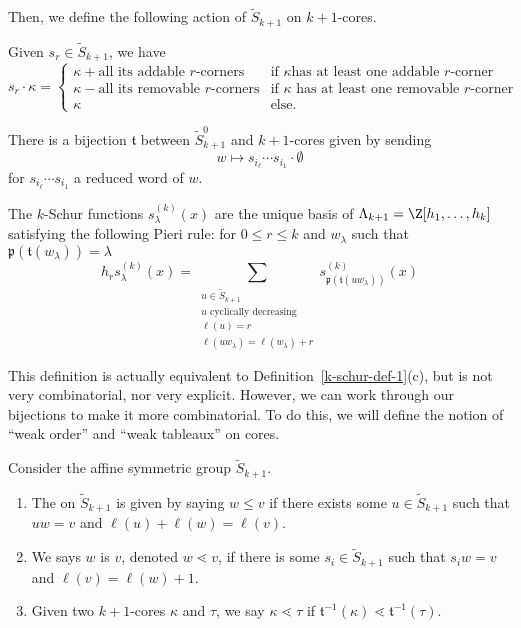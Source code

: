 \documentclass[11pt,leqno,oneside]{amsart}
\numberwithin{thm}{section}
\newcommand{\eS}{\tilde{S}}
\newcommand{\sym}{\Lambda}
\newcommand{\coveredby}{\mathrel{\lessdot}}
\begin{document}
Then, we define the following action of \(\eS_{k+1}\) on
\(k+1\)-cores.
\begin{defn}
  Given \(s_r \in \eS_{k+1}\), we have \[
    s_r \cdot \kappa =
    \begin{cases}
      \kappa + \text{all its addable $r$-corners} & \text{if $\kappa$
        has at least one addable $r$-corner}\\
      \kappa - \text{all its removable $r$-corners} & \text{if
        $\kappa$ has at least one removable $r$-corner}\\
      \kappa & \text{else.}
    \end{cases}
  \]
\end{defn}
\begin{prop}
  There is a bijection \(\mathfrak{t}\) between \(\eS_{k+1}^0\) and \(k+1\)-cores given
  by sending \[
    w \mapsto s_{i_\ell} \cdots s_{i_1} \cdot \emptyset
  \]
  for \(s_{i_\ell} \cdots s_{i_1}\) a reduced word of \(w\).
\end{prop}
\begin{defn}\label{k-schur-def-2}
  The \(k\)-Schur functions \(s_\lambda^{(k)}(x)\) are the unique
  basis of \(\sym_{k+1} = \Z[h_1,\ldots,h_k]\) satisfying the
  following Pieri
  rule:
  for \(0 \leq r \leq k\) and \(w_\lambda\) such that
  \(\mathfrak{p}(\mathfrak{t}(w_\lambda)) = \lambda\)
  \[
    h_r s_\lambda^{(k)}(x) = \sum_{\substack{u \in \eS_{k+1} \\ u
        \text{ cyclically decreasing}\\ \ell(u)
    = r \\ \ell(uw_\lambda) = \ell(w_\lambda)+r}} s_{\mathfrak{p}(\mathfrak{t}(uw_\lambda))}^{(k)}(x)
  \]
\end{defn}
This definition is actually equivalent to
Definition~\ref{k-schur-def-1}(c), but is not very combinatorial, nor
very explicit. However, we can work through our bijections to make it
more combinatorial. To do this, we will define the notion of ``weak
order'' and ``weak
tableaux'' on cores.
\begin{defn}
  Consider the affine symmetric group \(\eS_{k+1}\).
  \begin{enumerate}
  \item The  on \(\eS_{k+1}\) is given by saying
    \(w \leq v\) if there exists some \(u \in \eS_{k+1}\) such that
    \(uw = v\) and \(\ell(u) + \ell(w) = \ell(v)\).
  \item We says \(w\) is  \(v\), denoted \(w \coveredby v\),
    if there is some \(s_i \in \eS_{k+1}\) such that \(s_i w = v\) and
    \(\ell(v) = \ell(w)+1\).
  \item Given two \(k+1\)-cores \(\kappa\) and \(\tau\), we say
    \(\kappa \coveredby \tau\) if \(\mathfrak{t}^{-1}(\kappa)
    \coveredby \mathfrak{t}^{-1}(\tau)\).
  \end{enumerate}
\end{defn}
\end{document}
